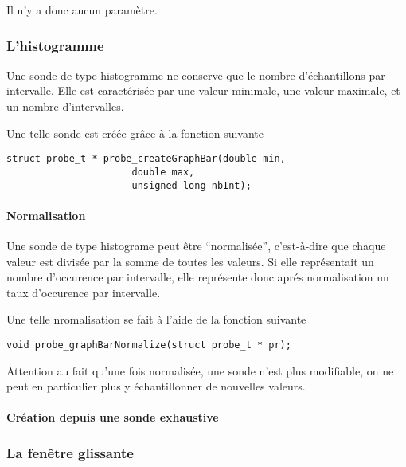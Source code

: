    Il n'y a donc aucun paramètre.

%
\subsubsection{L'histogramme}

   Une sonde de type histogramme ne conserve que le nombre
d'échantillons par intervalle. Elle est caractérisée par une valeur
minimale, une valeur maximale, et un nombre d'intervalles.

   Une telle sonde est créée grâce à la fonction suivante

\begin{verbatim}
struct probe_t * probe_createGraphBar(double min,
				      double max,
				      unsigned long nbInt);
\end{verbatim}

%
%
%
\paragraph{Normalisation}

   Une sonde de type histograme peut être ``normalisée'', c'est-à-dire
que chaque valeur est divisée par la somme de toutes les valeurs. Si
elle représentait un nombre d'occurence par intervalle, elle
représente donc aprés normalisation un taux d'occurence par
intervalle. 

   Une telle nromalisation se fait à l'aide de la fonction suivante

\begin{verbatim}
void probe_graphBarNormalize(struct probe_t * pr);
\end{verbatim}

   Attention au fait qu'une fois normalisée, une sonde n'est plus
modifiable, on ne peut en particulier plus y échantillonner de
nouvelles valeurs.

%
%
%
\paragraph{Création depuis une sonde exhaustive}

%
\subsubsection{La fenêtre glissante}


